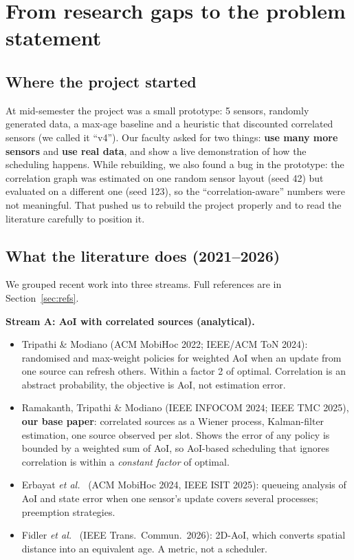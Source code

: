 \section{From research gaps to the problem statement}

\subsection{Where the project started}

At mid-semester the project was a small prototype: 5 sensors, randomly generated data, a max-age baseline and a
heuristic that discounted correlated sensors (we called it ``v4''). Our faculty asked for two things: \textbf{use many
more sensors} and \textbf{use real data}, and show a live demonstration of how the scheduling happens. While
rebuilding, we also found a bug in the prototype: the correlation graph was estimated on one random sensor layout
(seed 42) but evaluated on a different one (seed 123), so the ``correlation-aware'' numbers were not meaningful. That
pushed us to rebuild the project properly and to read the literature carefully to position it.

\subsection{What the literature does (2021--2026)}

We grouped recent work into three streams. Full references are in Section~\ref{sec:refs}.

\textbf{Stream A: AoI with correlated sources (analytical).}
\begin{itemize}
  \item Tripathi \& Modiano \cite{1} (ACM MobiHoc 2022; IEEE/ACM ToN 2024): randomised and max-weight policies for
        weighted AoI when an update from one source can refresh others. Within a factor 2 of optimal. Correlation is an
        abstract probability, the objective is AoI, not estimation error.
  \item Ramakanth, Tripathi \& Modiano \cite{2} (IEEE INFOCOM 2024; IEEE TMC 2025), \textbf{our base paper}: correlated
        sources as a Wiener process, Kalman-filter estimation, one source observed per slot. Shows the error of any
        policy is bounded by a weighted sum of AoI, so AoI-based scheduling that ignores correlation is within a
        \emph{constant factor} of optimal.
  \item Erbayat \emph{et al.}\ \cite{3,4} (ACM MobiHoc 2024, IEEE ISIT 2025): queueing analysis of AoI and state error
        when one sensor's update covers several processes; preemption strategies.
  \item Fidler \emph{et al.}\ \cite{5} (IEEE Trans.\ Commun.\ 2026): 2D-AoI, which converts spatial distance into an
        equivalent age. A metric, not a scheduler.
\end{itemize}

